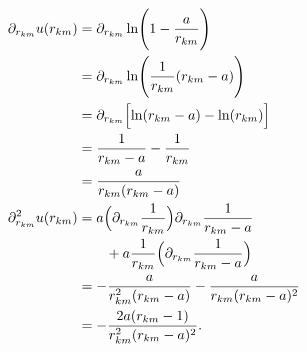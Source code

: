 \documentclass[
    a4paper, aps, twocolumn, floatfix, superscriptaddress]{revtex4-1}
\newcommand{\1}{\mathds{1}}
\begin{document}
            \begin{align}
                \partial_{r_{km}}u(r_{km})
                &=
                \partial_{r_{km}}
                \ln\Biggl(
                    1 - \frac{a}{r_{km}}
                \Biggr) \\
                &=
                \partial_{r_{km}}
                \ln\Biggl(
                    \frac{1}{r_{km}}
                    (r_{km} - a)
                \Biggr) \\
                &=
                \partial_{r_{km}}
                \Bigl[
                    \ln(r_{km} - a)
                    - \ln(r_{km})
                \Bigr] \\
                &=
                \frac{1}{r_{km} - a} - \frac{1}{r_{km}} \\
                &=
                \frac{a}{r_{km}(r_{km} - a)} \\
                \partial_{r_{km}}^2u(r_{km})
                &= a\Bigl(
                    \partial_{r_{km}}\frac{1}{r_{km}}
                \Bigr)
                \partial_{r_{km}}\frac{1}{r_{km} - a}
                \nonumber \\
                &\qquad
                + a\frac{1}{r_{km}}
                \Bigl(
                    \partial_{r_{km}}\frac{1}{r_{km} - a}
                \Bigr) \\
                &=
                -\frac{a}{r_{km}^2(r_{km} - a)}
                -\frac{a}{r_{km}(r_{km} - a)^2} \\
                &=
                - \frac{2a(r_{km} - 1)}{r_{km}^2(r_{km} - a)^2}.
            \end{align}
\end{document}
